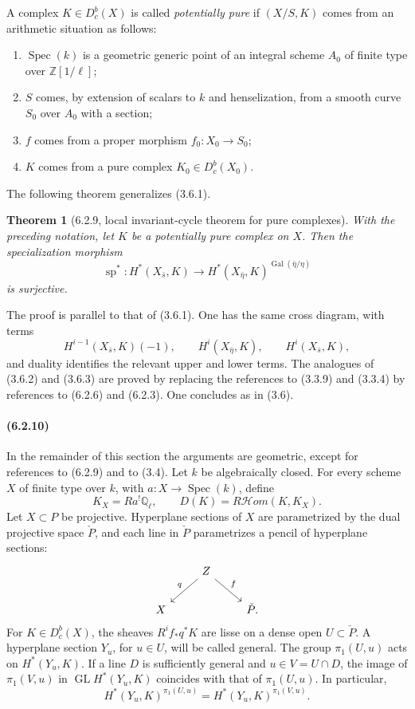 \documentclass[11pt]{article}
\newtheorem{theorem}{Theorem}
\theoremstyle{remark}
\newcommand{\Ql}{\mathbb{Q}_\ell}
\newcommand{\ZZ}{\mathbb{Z}}
\begin{document}
A complex \(K\in D^b_c(X)\) is called \emph{potentially pure} if \((X/S,K)\) comes from an arithmetic situation as follows:
\begin{enumerate}[label=\alph*)]
\item \(\operatorname{Spec}(k)\) is a geometric generic point of an integral scheme \(A_0\) of finite type over \(\ZZ[1/\ell]\);
\item \(S\) comes, by extension of scalars to \(k\) and henselization, from a smooth curve \(S_0\) over \(A_0\) with a section;
\item \(f\) comes from a proper morphism \(f_0:X_0\to S_0\);
\item \(K\) comes from a pure complex \(K_0\in D^b_c(X_0)\).
\end{enumerate}

The following theorem generalizes (3.6.1).

\begin{theorem}[6.2.9, local invariant-cycle theorem for pure complexes]
With the preceding notation, let \(K\) be a potentially pure complex on \(X\).  Then the specialization morphism
\[
\operatorname{sp}^*:H^*(X_{\bar s},K)\longrightarrow H^*(X_{\bar\eta},K)^{\operatorname{Gal}(\bar\eta/\eta)}
\]
is surjective.
\end{theorem}

The proof is parallel to that of (3.6.1).  One has the same cross diagram, with terms
\[
H^{i-1}(X_{\bar s},K)(-1),\qquad H^i(X_{\bar\eta},K),\qquad H^i(X_{\bar s},K),
\]
and duality identifies the relevant upper and lower terms.  The analogues of (3.6.2) and (3.6.3) are proved by replacing the references to (3.3.9) and (3.3.4) by references to (6.2.6) and (6.2.3).  One concludes as in (3.6).

\paragraph{(6.2.10)}
In the remainder of this section the arguments are geometric, except for references to (6.2.9) and to (3.4).  Let \(k\) be algebraically closed.  For every scheme \(X\) of finite type over \(k\), with \(a:X\to\operatorname{Spec}(k)\), define
\[
K_X=Ra^!\Ql,
\qquad
D(K)=R\mathcal Hom(K,K_X).
\]
Let \(X\subset P\) be projective.  Hyperplane sections of \(X\) are parametrized by the dual projective space \(\check P\), and each line in \(\check P\) parametrizes a pencil of hyperplane sections:
\[
\begin{tikzcd}
& Z \arrow[dl,"q"'] \arrow[dr,"f"] & \\
X && \check P .
\end{tikzcd}
\]
For \(K\in D^b_c(X)\), the sheaves \(R^if_*q^*K\) are lisse on a dense open \(U\subset\check P\).  A hyperplane section \(Y_u\), for \(u\in U\), will be called general.  The group \(\pi_1(U,u)\) acts on \(H^*(Y_u,K)\).  If a line \(D\) is sufficiently general and \(u\in V=U\cap D\), the image of \(\pi_1(V,u)\) in \(\operatorname{GL}H^*(Y_u,K)\) coincides with that of \(\pi_1(U,u)\).  In particular,
\[
H^*(Y_u,K)^{\pi_1(U,u)}=H^*(Y_u,K)^{\pi_1(V,u)}. \tag{6.2.10.2}
\]
\end{document}
